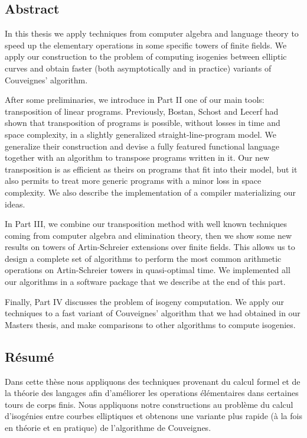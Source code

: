 \subsection*{Abstract}
In this thesis we apply techniques from computer algebra and language
theory to speed up the elementary operations in some specific towers
of finite fields. We apply our construction to the problem of
computing isogenies between elliptic curves and obtain faster (both
asymptotically and in practice) variants of Couveignes' algorithm.

After some preliminaries, we introduce in Part II one of our main
tools: transposition of linear programs. Previously, Bostan, Schost
and Lecerf had shown that transposition of programs is possible,
without losses in time and space complexity, in a slightly generalized
straight-line-program model. We generalize their construction and
devise a fully featured functional language together with an algorithm
to transpose programs written in it. Our new transposition is as
efficient as theirs on programs that fit into their model, but it also
permits to treat more generic programs with a minor loss in space
complexity. We also describe the implementation of a compiler
materializing our ideas.

In Part III, we combine our transposition method with well known
techniques coming from computer algebra and elimination theory, then
we show some new results on towers of Artin-Schreier extensions over
finite fields. This allows us to design a complete set of algorithms
to perform the most common arithmetic operations on Artin-Schreier
towers in quasi-optimal time. We implemented all our algorithms in a
software package that we describe at the end of this part.

Finally, Part IV discusses the problem of isogeny computation. We
apply our techniques to a fast variant of Couveignes' algorithm that
we had obtained in our Masters thesis, and make comparisons to other
algorithms to compute isogenies.



\subsection*{Résumé}

Dans cette thèse nous appliquons des techniques provenant du calcul
formel et de la théorie des langages afin d'améliorer les operations
élémentaires dans certaines tours de corps finis. Nous appliquons
notre constructions au problème du calcul d'isogénies entre courbes
elliptiques et obtenons une variante plus rapide (à la fois en théorie
et en pratique) de l'algorithme de Couveignes.

